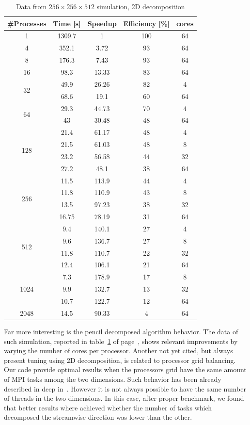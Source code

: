 \begin{table}
\caption{Data from $256\times 256\times 512$  simulation, 2D decomposition}
\begin{center}
\begin{tabular}{c c c c c}
\toprule
\textbf{\#Processes} & \textbf{Time [s]} & \textbf{Speedup} & \textbf{Efficiency [\%]} & \textbf{cores}\\
\midrule
1 & 1309.7 & 1 & 100 & 64 \\
4 & 352.1 & 3.72 & 93 & 64\\
8 & 176.3 & 7.43 & 93 & 64\\
16 & 98.3 & 13.33 & 83 & 64\\
\hline
\multirow{2}{*}{32} & 49.9 & 26.26 & 82 & 4\\
& 68.6 & 19.1 & 60 & 64\\
\hline
\multirow{2}{*}{64} & 29.3 & 44.73 & 70 & 4\\ 
 & 43 & 30.48 & 48 & 64\\
\hline
\multirow{4}{*}{128} & 21.4 & 61.17 &  48 & 4\\
& 21.5 & 61.03 & 48 & 8\\
& 23.2 & 56.58 & 44 & 32\\
& 27.2 & 48.1 & 38 & 64\\
\hline
\multirow{4}{*}{256} & 11.5 & 113.9 & 44 & 4\\
& 11.8 & 110.9 & 43 & 8\\
&13.5 & 97.23 & 38 & 32\\
&16.75 & 78.19 & 31 & 64\\
\hline
\multirow{4}{*}{512} & 9.4 & 140.1 & 27 & 4\\
&9.6 & 136.7 & 27 & 8\\
&11.8 & 110.7 & 22 & 32\\
&12.4 & 106.1 & 21 & 64\\
\hline
\multirow{3}{*}{1024} & 7.3 & 178.9 & 17 & 8\\
&9.9 & 132.7 & 13 & 32\\
&10.7 & 122.7 & 12 & 64\\
\hline
2048 & 14.5 & 90.33 & 4 & 64\\
\bottomrule
\end{tabular}
\end{center}
\label{128:data:2}
\end{table}

\par
Far more interesting is the pencil decomposed algorithm behavior. The data of such simulation, reported in table~\ref{128:data:2} of page~\pageref{128:data:2}, shows relevant improvements by varying the number of cores per processor. Another not yet cited, but always present tuning using 2D decomposition, is related to processor grid balancing. Our code provide optimal results when the processors grid have the same amount of MPI tasks among the two dimensions. Such behavior has been already described in deep in~\cite[39]{tesi:brach}. However it is not always possible to have the same number of threads in the two dimensions. In this case, after proper benchmark, we found that better results where achieved whether the number of tasks which decomposed the streamwise direction was lower than the other.
\par

